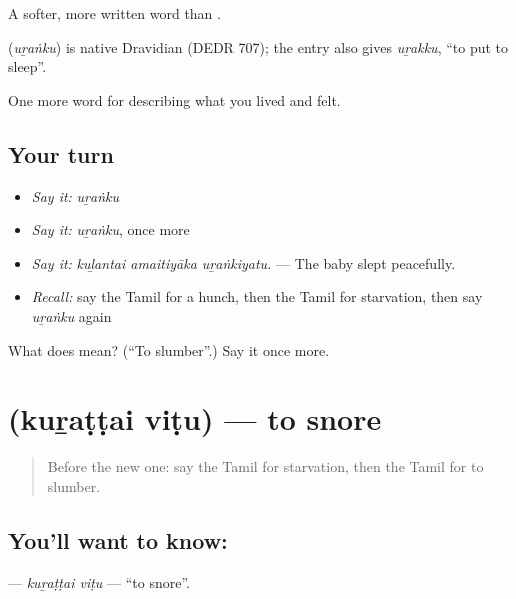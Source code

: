 A softer, more written word than .

\begin{cousinweb}
\textbf{} (\emph{uṟaṅku}) is native Dravidian (DEDR 707); the entry also gives  \emph{uṟakku}, \textquotedblleft{}to put to sleep\textquotedblright{}.
\end{cousinweb}

\begin{grammarlens}[title={What you've built}]
One more word for describing what you lived and felt.
\end{grammarlens}

\subsection*{Your turn}
\begin{itemize}
\raggedright
  \item \emph{Say it:} \emph{uṟaṅku}
  \item \emph{Say it:} \emph{uṟaṅku}, once more
  \item \emph{Say it:} \emph{kuḻantai amaitiyāka uṟaṅkiyatu.} — The baby slept peacefully.
  \item \emph{Recall:} say the Tamil for a hunch, then the Tamil for starvation, then say \emph{uṟaṅku} again
\end{itemize}

\begin{tcolorbox}[breakable,colback=teal!4,colframe=teal!35!black,title={Before you move on}]
What does  mean? (\textquotedblleft{}To slumber\textquotedblright{}.) Say it once more.
\end{tcolorbox}
\section[\texorpdfstring{\ta{குறட்டை} \ta{விடு} (kuṟaṭṭai viṭu)}{குறட்டை விடு (kuṟaṭṭai viṭu)}]{  (kuṟaṭṭai viṭu) — to snore}

\label{lesson:TA-C489-kurattai-vitu}



\begin{quote}
Before the new one: say the Tamil for starvation, then the Tamil for to slumber.
\end{quote}

\subsection*{You'll want to know:  }
\textbf{ } — \emph{kuṟaṭṭai viṭu} — \textquotedblleft{}to snore\textquotedblright{}.

